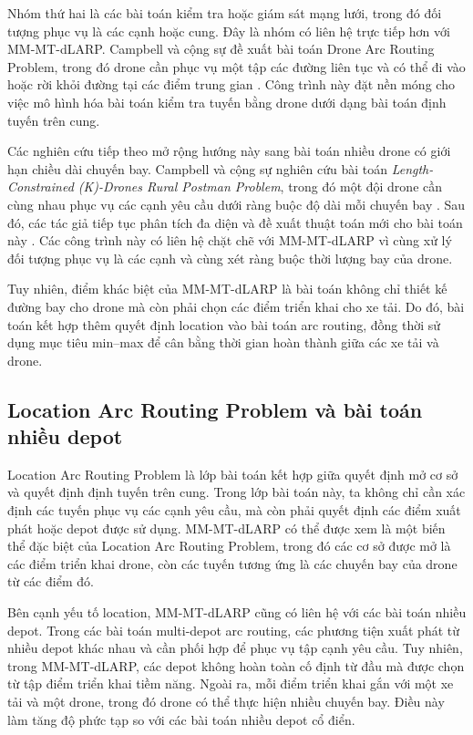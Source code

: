 Nhóm thứ hai là các bài toán kiểm tra hoặc giám sát mạng lưới, trong đó đối tượng phục vụ là các cạnh hoặc cung. Đây là nhóm có liên hệ trực tiếp hơn với MM-MT-dLARP. Campbell và cộng sự đề xuất bài toán Drone Arc Routing Problem, trong đó drone cần phục vụ một tập các đường liên tục và có thể đi vào hoặc rời khỏi đường tại các điểm trung gian \cite{campbell2018darp}. Công trình này đặt nền móng cho việc mô hình hóa bài toán kiểm tra tuyến bằng drone dưới dạng bài toán định tuyến trên cung.

Các nghiên cứu tiếp theo mở rộng hướng này sang bài toán nhiều drone có giới hạn chiều dài chuyến bay. Campbell và cộng sự nghiên cứu bài toán \textit{Length-Constrained (K)-Drones Rural Postman Problem}, trong đó một đội drone cần cùng nhau phục vụ các cạnh yêu cầu dưới ràng buộc độ dài mỗi chuyến bay \cite{campbell2021kdrone}. Sau đó, các tác giả tiếp tục phân tích đa diện và đề xuất thuật toán mới cho bài toán này \cite{campbell2022polyhedral}. Các công trình này có liên hệ chặt chẽ với MM-MT-dLARP vì cùng xử lý đối tượng phục vụ là các cạnh và cùng xét ràng buộc thời lượng bay của drone.

Tuy nhiên, điểm khác biệt của MM-MT-dLARP là bài toán không chỉ thiết kế đường bay cho drone mà còn phải chọn các điểm triển khai cho xe tải. Do đó, bài toán kết hợp thêm quyết định location vào bài toán arc routing, đồng thời sử dụng mục tiêu min--max để cân bằng thời gian hoàn thành giữa các xe tải và drone.

\subsection{Location Arc Routing Problem và bài toán nhiều depot}

Location Arc Routing Problem là lớp bài toán kết hợp giữa quyết định mở cơ sở và quyết định định tuyến trên cung. Trong lớp bài toán này, ta không chỉ cần xác định các tuyến phục vụ các cạnh yêu cầu, mà còn phải quyết định các điểm xuất phát hoặc depot được sử dụng. MM-MT-dLARP có thể được xem là một biến thể đặc biệt của Location Arc Routing Problem, trong đó các cơ sở được mở là các điểm triển khai drone, còn các tuyến tương ứng là các chuyến bay của drone từ các điểm đó.

Bên cạnh yếu tố location, MM-MT-dLARP cũng có liên hệ với các bài toán nhiều depot. Trong các bài toán multi-depot arc routing, các phương tiện xuất phát từ nhiều depot khác nhau và cần phối hợp để phục vụ tập cạnh yêu cầu. Tuy nhiên, trong MM-MT-dLARP, các depot không hoàn toàn cố định từ đầu mà được chọn từ tập điểm triển khai tiềm năng. Ngoài ra, mỗi điểm triển khai gắn với một xe tải và một drone, trong đó drone có thể thực hiện nhiều chuyến bay. Điều này làm tăng độ phức tạp so với các bài toán nhiều depot cổ điển.

